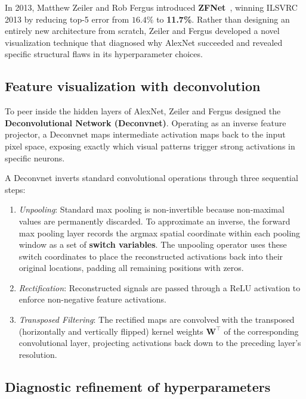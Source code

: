 In 2013, Matthew Zeiler and Rob Fergus introduced \textbf{ZFNet}~\cite{zeiler2014visualizing}, winning ILSVRC 2013 by reducing top-5 error from $16.4\%$ to \textbf{11.7\%}. Rather than designing an entirely new architecture from scratch, Zeiler and Fergus developed a novel visualization technique that diagnosed why AlexNet succeeded and revealed specific structural flaws in its hyperparameter choices.

\subsection{Feature visualization with deconvolution}
\label{sec:zfnet_deconvnet}

To peer inside the hidden layers of AlexNet, Zeiler and Fergus designed the \textbf{Deconvolutional Network (Deconvnet)}. Operating as an inverse feature projector, a Deconvnet maps intermediate activation maps back to the input pixel space, exposing exactly which visual patterns trigger strong activations in specific neurons.

A Deconvnet inverts standard convolutional operations through three sequential steps:
\begin{enumerate}[leftmargin=*]
  \item \textit{Unpooling}: Standard max pooling is non-invertible because non-maximal values are permanently discarded. To approximate an inverse, the forward max pooling layer records the argmax spatial coordinate within each pooling window as a set of \textbf{switch variables}. The unpooling operator uses these switch coordinates to place the reconstructed activations back into their original locations, padding all remaining positions with zeros.
  \item \textit{Rectification}: Reconstructed signals are passed through a ReLU activation to enforce non-negative feature activations.
  \item \textit{Transposed Filtering}: The rectified maps are convolved with the transposed (horizontally and vertically flipped) kernel weights $\mathbf{W}^\top$ of the corresponding convolutional layer, projecting activations back down to the preceding layer's resolution.
\end{enumerate}

\subsection{Diagnostic refinement of hyperparameters}
\label{sec:zfnet_refinement}

